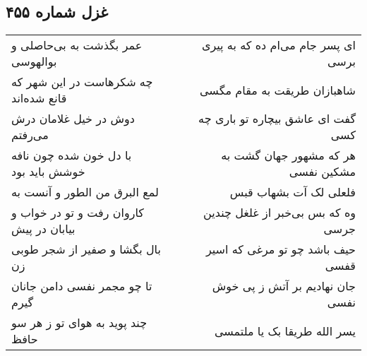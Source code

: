 \begin{center}
\section*{غزل شماره ۴۵۵}
\label{sec:sh455}
\begin{longtable}{l p{0.5cm} r}
عمر بگذشت به بی‌حاصلی و بوالهوسی
&&
ای پسر جام می‌ام ده که به پیری برسی
\\
چه شکرهاست در این شهر که قانع شده‌اند
&&
شاهبازان طریقت به مقام مگسی
\\
دوش در خیل غلامان درش می‌رفتم
&&
گفت ای عاشق بیچاره تو باری چه کسی
\\
با دل خون شده چون نافه خوشش باید بود
&&
هر که مشهور جهان گشت به مشکین نفسی
\\
لمع البرق من الطور و آنست به
&&
فلعلی لک آت بشهاب قبس
\\
کاروان رفت و تو در خواب و بیابان در پیش
&&
وه که بس بی‌خبر از غلغل چندین جرسی
\\
بال بگشا و صفیر از شجر طوبی زن
&&
حیف باشد چو تو مرغی که اسیر قفسی
\\
تا چو مجمر نفسی دامن جانان گیرم
&&
جان نهادیم بر آتش ز پی خوش نفسی
\\
چند پوید به هوای تو ز هر سو حافظ
&&
یسر الله طریقا بک یا ملتمسی
\\
\end{longtable}
\end{center}
